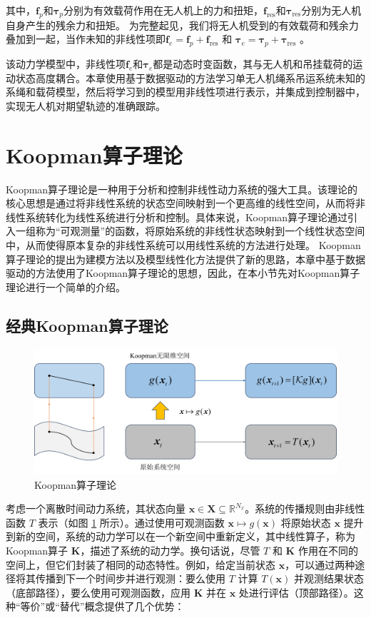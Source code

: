 \documentclass[lang=chs, degree=master, blindreview=false, winfonts=true]{yanputhesis}
\begin{document}
其中，$\bm{f}_p$和$\bm{\tau}_p$分别为有效载荷作用在无人机上的力和扭矩，$\bm{f}_\text{res}$和$\bm{\tau}_\text{res}$分别为无人机自身产生的残余力和扭矩。
为完整起见，我们将无人机受到的有效载荷和残余力叠加到一起，当作未知的非线性项即$\bm f_e = \bm f_p+ \bm f_{\text{res}}$ 和 $\bm \tau_e = \bm \tau_p+\bm \tau_{\text{res}}$ 。
	
该动力学模型中，非线性项$\bm f_e$和$\bm \tau_e$都是动态时变函数，其与无人机和吊挂载荷的运动状态高度耦合。本章使用基于数据驱动的方法学习单无人机绳系吊运系统未知的系绳和载荷模型，然后将学习到的模型用非线性项进行表示，并集成到控制器中，实现无人机对期望轨迹的准确跟踪。 




\section{Koopman算子理论}

Koopman算子理论是一种用于分析和控制非线性动力系统的强大工具\cite{1931Hamiltonian}。该理论的核心思想是通过将非线性系统的状态空间映射到一个更高维的线性空间，从而将非线性系统转化为线性系统进行分析和控制。具体来说，Koopman算子理论通过引入一组称为“可观测量”的函数，将原始系统的非线性状态映射到一个线性状态空间中，从而使得原本复杂的非线性系统可以用线性系统的方法进行处理。
Koopman算子理论的提出为建模方法以及模型线性化方法提供了新的思路，本章中基于数据驱动的方法使用了Koopman算子理论的思想，因此，在本小节先对Koopman算子理论进行一个简单的介绍。

\subsection{经典Koopman算子理论}
\begin{figure}[hbt!]
	\centering
	\includegraphics[width=37pc]{picture/3_1.png} 
	\caption{Koopman算子理论} \label{3_1}
\end{figure}
考虑一个离散时间动力系统，其状态向量 \( \bm x \in \mathcal{\bm X} \subseteq \mathbb{R}^{N_x} \)。系统的传播规则由非线性函数 \( T \) 表示（如图 \ref{3_1} 所示）。通过使用可观测函数 \( \bm x \mapsto g(\bm x) \) 将原始状态 \( \bm x \) 提升到新的空间，系统的动力学可以在一个新空间中重新定义，其中线性算子，称为Koopman算子 \( \mathcal{\bm K} \)，描述了系统的动力学。换句话说，尽管 \( T \) 和 \( \mathcal{\bm K} \) 作用在不同的空间上，但它们封装了相同的动态特性。例如，给定当前状态 \( \bm x \)，可以通过两种途径将其传播到下一个时间步并进行观测：要么使用 \( T \) 计算 \( T(\bm x) \) 并观测结果状态（底部路径），要么使用可观测函数，应用 \( \mathcal{\bm K} \) 并在 \( \bm x \) 处进行评估（顶部路径）。这种“等价”或“替代”概念提供了几个优势：
\end{document}
